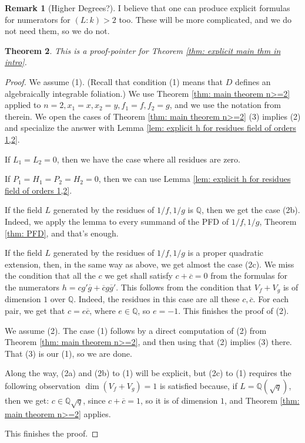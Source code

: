 \documentclass{amsart}
\newcommand{\op}{\operatorname}
\newtheorem{thm}{Theorem}[section]
\theoremstyle{definition}
\newtheorem{remark}[thm]{Remark}
\begin{document}
\begin{remark}[Higher Degrees?]
    I believe that one can produce explicit formulas for numerators for $(L:k)>2$ too. These will be more complicated, and we do not need them, so we do not.
\end{remark}

\begin{thm}\label{thm: explicit, n=2, both L, over rational number}
    This is a proof-pointer for Theorem \ref{thm: explicit main thm in intro}.
\end{thm}

\begin{proof} We assume (1). (Recall that condition (1) means that $D$ defines an algebraically integrable foliation.) We use Theorem \ref{thm: main theorem n>=2} applied to $n=2,x_1=x,x_2=y,f_1=f,f_2=g$, and we use the notation from therein. We open the cases of Theorem \ref{thm: main theorem n>=2} (3) implies (2) and specialize the answer with Lemma \ref{lem: explicit h for residues field of orders 1,2}.

If $L_1=L_2=0$, then we have the case where all residues are zero.

If $P_1=H_1=P_2=H_2=0$, then we can use Lemma \ref{lem: explicit h for residues field of orders 1,2}. 

If the field $L$ generated by the residues of $1/f,1/g$ is $\mathbb{Q}$, then we get the case (2b). Indeed, we apply the lemma to every summand of the PFD of $1/f,1/g$, Theorem \ref{thm: PFD}, and that's enough.

If the field $L$ generated by the residues of $1/f,1/g$ is a proper quadratic extension, then, in the same way as above, we get almost the case (2c). We miss the condition that all the $c$ we get shall satisfy $c+\overline{c}=0$ from the formulas for the numerators $h=cg' \overline{g}+ \overline{c}g\overline{g}'$. 
This follows from the condition that $V_f+V_g$ is of dimension $1$ over $\mathbb{Q}$. Indeed, the residues in this case are all these $c,\overline{c}$. For each pair, we get that $c=e\overline{c}$, where $e\in\mathbb{Q}$, so $e=-1$.  
This finishes the proof of (2).

We assume (2). The case (1) follows by a direct computation of (2) from Theorem \ref{thm: main theorem n>=2}, and then using that (2) implies (3) there. That (3) is our (1), so we are done.

Along the way, (2a) and (2b) to (1) will be explicit, but (2c) to (1) requires the following observation $\op{dim}(V_f+V_g)=1$ is satisfied because, if $L=\mathbb{Q}(\sqrt{q})$, then we get: $c\in \mathbb{Q}\sqrt{q}$, since $c+\overline{c}=1$, so it is of dimension $1$, and Theorem \ref{thm: main theorem n>=2} applies.

This finishes the proof.
\end{proof}
\end{document}
